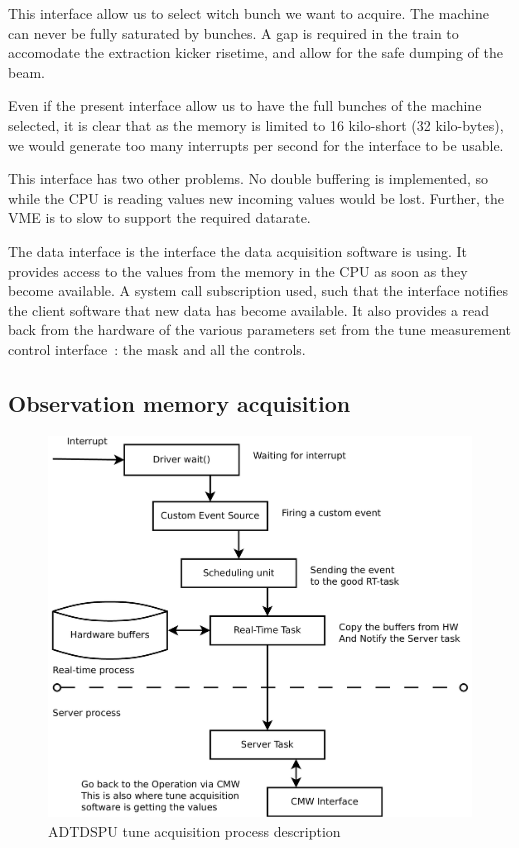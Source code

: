 This interface allow us to select witch bunch we want to acquire. The
machine can never be fully saturated by bunches. A gap is required in
the train to accomodate the extraction kicker risetime, and allow for
the safe dumping of the beam.

Even if the present interface allow us to have the full bunches of the
machine selected, it is clear that as the memory is limited to 16
kilo-short (32 kilo-bytes), we would generate too many interrupts per
second for the interface to be usable.

This interface has two other problems. No double buffering is
implemented, so while the \gls{CPU} is reading values new incoming
values would be lost. Further, the \gls{VME} is to slow to support the
required datarate.

The data interface is the interface the data acquisition software is
using. It provides access to the values from the memory in the
\gls{CPU} as soon as they become available. A system call subscription
used, such that the interface notifies the client software that new
data has become available. It also provides a read back from the
hardware of the various parameters set from the tune measurement
control interface~: the mask and all the controls.

\subsection{Observation memory acquisition}
\label{sec:obs_mem_acq}

\begin{figure}[H]
\caption{ADTDSPU tune acquisition process description}
\centering
\includegraphics[scale=0.3]{adtdspu_acq.pdf}
\end{figure}

